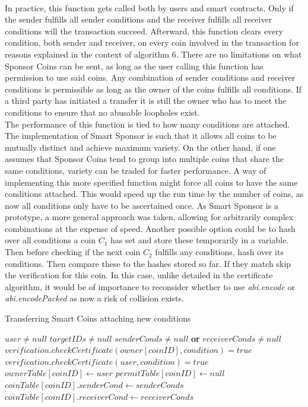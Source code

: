 \\
In practice, this function gets called both by users and smart contracts. Only if the sender fulfills all sender conditions and the receiver fulfills all receiver conditions will the transaction succeed. Afterward, this function clears every condition, both sender and receiver, on every coin involved in the transaction for reasons explained in the context of algorithm 6. There are no limitations on what Sponsor Coins can be sent, as long as the user calling this function has permission to use said coins. Any combination of sender conditions and receiver conditions is permissible as long as the owner of the coins fulfills all conditions. If a third party has initiated a transfer it is still the owner who has to meet the conditions to ensure that no abusable loopholes exist.\\
The performance of this function is tied to how many conditions are attached. The implementation of Smart Sponsor is such that it allows all coins to be mutually distinct and achieve maximum variety. On the other hand, if one assumes that Sponsor Coins tend to group into multiple coins that share the same conditions, variety can be traded for faster performance. A way of implementing this more specified function might force all coins to have the same conditions attached. This would speed up the run time by the number of coins, as now all conditions only have to be ascertained once. As Smart Sponsor is a prototype, a more general approach was taken, allowing for arbitrarily complex combinations at the expense of speed. Another possible option could be to hash over all conditions a coin $C_1$ has set and store these temporarily in a variable. Then before checking if the next coin $C_2$ fulfills any conditions, hash over its conditions. Then compare these to the hashes stored so far. If they match skip the verification for this coin. In this case, unlike detailed in the certificate algorithm, it would be of importance to reconsider whether to use \emph{abi.encode} or \emph{abi.encodePacked} as now a risk of collision exists.\\
\begin{algorithm}
\caption{Transferring Smart Coins attaching new conditions}\label{alg:attach}
\begin{algorithmic}[1]
\Require $user \neq null$
\Require $targetIDs \neq null$
\Require $senderConds \neq null $ \textbf{or} $receiverConds \neq null$
\Ensure $verification.checkCertificate(owner[coinID], condition) = true$
\EndFor
{}
\Ensure $verification.checkCertificate(user, condition) = true$
\EndFor
\State $ownerTable[coinID] \gets user$
\State $permitTable[coinID] \gets null$
\State $coinTable[coinID].senderCond \gets senderConds$
\State $coinTable[coinID].receiverCond \gets receiverConds$
\EndIf
\EndFor
\end{algorithmic}
\end{algorithm}
